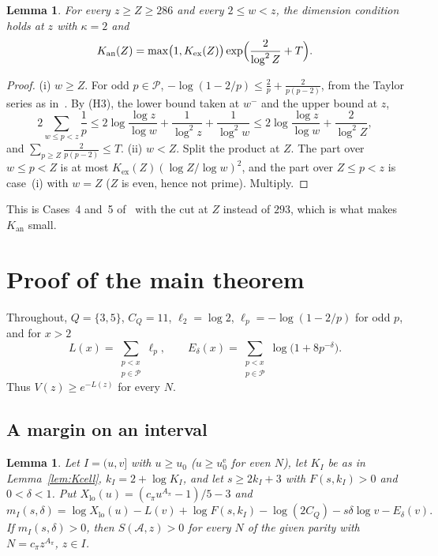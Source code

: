 \documentclass[preprint,11pt]{elsarticle}
\newtheorem{lemma}[theorem]{Lemma}
\theoremstyle{definition}
\theoremstyle{remark}
\newcommand{\cA}{\mathcal{A}}
\newcommand{\cP}{\mathcal{P}}
\numberwithin{equation}{section}
\begin{document}
\begin{lemma}\label{lem:A1}
For every $z\ge Z\ge286$ and every $2\le w<z$, the dimension condition
holds at $z$ with $\kappa=2$ and
\[
  K_{\mathrm{an}}(Z)=\max\bigl(1,K_{\mathrm{ex}}(Z)\bigr)\exp\Bigl(\frac{2}{\log^2Z}+T\Bigr).
\]
\end{lemma}

\begin{proof}
(i) $w\ge Z$. For odd $p\in\cP$, $-\log(1-2/p)\le\frac2p+\frac{2}{p(p-2)}$,
from the Taylor series as in~\cite[(4.1)]{Campbell2026}. By (H3), the lower
bound taken at $w^-$ and the upper bound at $z$,
\[
  2\sum_{w\le p<z}\frac1p\le2\log\frac{\log z}{\log w}+\frac1{\log^2z}+\frac1{\log^2w}
  \le2\log\frac{\log z}{\log w}+\frac{2}{\log^2Z},
\]
and $\sum_{p\ge Z}\frac{2}{p(p-2)}\le T$.
(ii) $w<Z$. Split the product at $Z$. The part over $w\le p<Z$ is at most
$K_{\mathrm{ex}}(Z)(\log Z/\log w)^2$, and the part over $Z\le p<z$ is
case~(i) with $w=Z$ ($Z$ is even, hence not prime). Multiply.
\end{proof}

This is Cases~4 and~5 of~\cite[Lemma~4.1]{Campbell2026} with the cut at $Z$
instead of $293$, which is what makes $K_{\mathrm{an}}$ small.

\section{Proof of the main theorem}\label{sec:proof}

Throughout, $Q=\{3,5\}$, $C_Q=11$, $\ell_2=\log2$, $\ell_p=-\log(1-2/p)$ for
odd $p$, and for $x>2$
\[
  L(x)=\sum_{\substack{p<x\\ p\in\cP}}\ell_p,\qquad
  E_\delta(x)=\sum_{\substack{p<x\\ p\in\cP}}\log\bigl(1+8p^{-\delta}\bigr).
\]
Thus $V(z)\ge e^{-L(z)}$ for every $N$.

\subsection{A margin on an interval}

\begin{lemma}\label{lem:margin}
Let $I=(u,v]$ with $u\ge u_0$ ($u\ge u_0^{\mathrm{e}}$ for even $N$), let
$K_I$ be as in Lemma~\ref{lem:Kcell}, $k_I=2+\log K_I$, and let
$s\ge2k_I+3$ with $F(s,k_I)>0$ and $0<\delta<1$. Put
$X_{\mathrm{lo}}(u)=(c_\pi u^{A_\pi}-1)/5-3$ and
\[
  m_I(s,\delta)=\log X_{\mathrm{lo}}(u)-L(v)+\log F(s,k_I)-\log(2C_Q)
  -s\delta\log v-E_\delta(v).
\]
If $m_I(s,\delta)>0$, then $S(\cA,z)>0$ for every $N$ of the given
parity with $N=c_\pi z^{A_\pi}$, $z\in I$.
\end{lemma}
\end{document}
